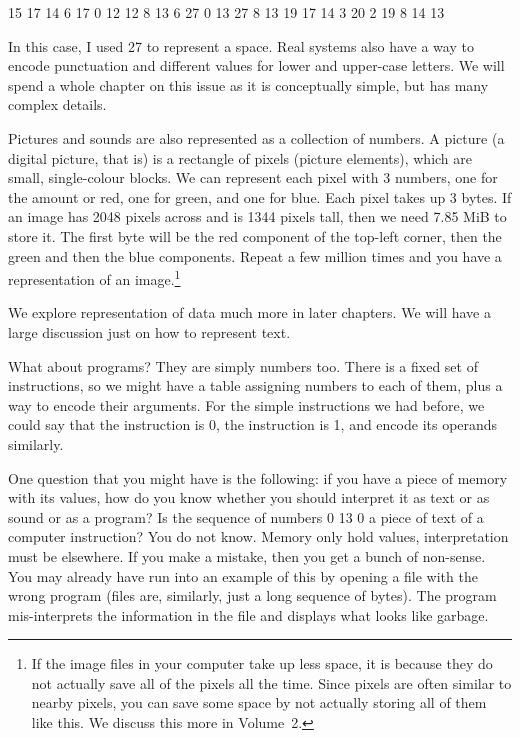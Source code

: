 15 17 14 6 17 0 12 12 8 13 6 27 0 13 27 8 13 19 17 14 3 20 2 19 8 14 13

In this case, I used 27 to represent a space. Real systems also have a way to
encode punctuation and different values for lower and upper-case letters. We
will spend a whole chapter on this issue as it is conceptually simple, but has
many complex details.

\medskip

Pictures and sounds are also represented as a collection of numbers. A picture
(a digital picture, that is) is a rectangle of pixels (picture elements), which
are small, single-colour blocks. We can represent each pixel with 3 numbers,
one for the amount or red, one for green, and one for blue. Each pixel takes up
3 bytes. If an image has 2048 pixels across and is 1344 pixels tall, then we
need 7.85 MiB to store it. The first byte will be the red component of the
top-left corner, then the green and then the blue components. Repeat a few
million times and you have a representation of an image.\footnote{If the image
files in your computer take up less space, it is because they do not actually
save all of the pixels all the time. Since pixels are often similar to nearby
pixels, you can save some space by not actually storing all of them like this.
We discuss this more in Volume~2.}

We explore representation of data much more in later chapters. We will have a
large discussion just on how to represent text.

What about programs? They are simply numbers too. There is a fixed set of
instructions, so we might have a table assigning numbers to each of them, plus
a way to encode their arguments. For the simple instructions we had before, we
could say that the  instruction is 0, the 
instruction is 1, and encode its operands similarly.

One question that you might have is the following: if you have a piece of
memory with its values, how do you know whether you should interpret it as text
or as sound or as a program? Is the sequence of numbers 0 13 0 a piece of text
of a computer instruction? You do not know. Memory only hold values,
interpretation must be elsewhere. If you make a mistake, then you get a bunch
of non-sense. You may already have run into an example of this by opening a
file with the wrong program (files are, similarly, just a long sequence of
bytes). The program mis-interprets the information in the file and displays
what looks like garbage.

